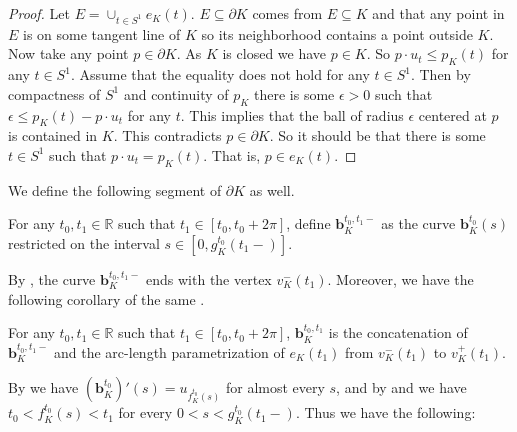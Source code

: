 \begin{proof}
Let \(E = \cup_{t \in S^1} e_K(t)\). \(E \subseteq \partial K\) comes from \(E \subseteq K\) and that any point in \(E\) is on some tangent line of \(K\) so its neighborhood contains a point outside \(K\). Now take any point \(p \in \partial K\). As \(K\) is closed we have \(p \in K\). So \(p \cdot u_t \leq p_K(t)\) for any \(t \in S^1\). Assume that the equality does not hold for any \(t \in S^1\). Then by compactness of \(S^1\) and continuity of \(p_K\) there is some \(\epsilon > 0\) such that \(\epsilon \leq p_K(t) - p\cdot u_t\) for any \(t\). This implies that the ball of radius \(\epsilon\) centered at \(p\) is contained in \(K\). This contradicts \(p \in \partial K\). So it should be that there is some \(t \in S^1\) such that \(p \cdot u_t = p_K(t)\). That is, \(p \in e_K(t)\).
\end{proof}

We define the following segment of \(\partial K\) as well.

\begin{definition}

For any \(t_0, t_1 \in \mathbb{R}\) such that \(t_1 \in [t_0, t_0 + 2 \pi]\), define \(\mathbf{b}_{K}^{t_0, t_1-}\) as the curve \(\mathbf{b}_{K}^{t_0} (s)\) restricted on the interval \(s \in [0, g_{K}^{t_0}(t_1-)]\).

\label{def:param-segment-open}
\end{definition}

By , the curve \(\mathbf{b}_K^{t_0, t_1-}\) ends with the vertex \(v_K^-(t_1)\). Moreover, we have the following corollary of the same .

\begin{corollary}

For any \(t_0, t_1 \in \mathbb{R}\) such that \(t_1 \in [t_0, t_0 + 2 \pi]\), \(\mathbf{b}_K^{t_0, t_1}\) is the concatenation of \(\mathbf{b}_K^{t_0, t_1 - }\) and the arc-length parametrization of \(e_K(t_1)\) from \(v_K^-(t_1)\) to \(v_K^+(t_1)\).

\label{cor:param-segment-open}
\end{corollary}

By  we have \(\left(\mathbf{b}_{K}^{t_0}\right)'(s) = u_{f_K^{t_0}(s)}\) for almost every \(s\), and by  and  we have \(t_0 < f_K^{t_0}(s) < t_1\) for every \(0 < s < g_{K}^{t_0}(t_1-)\). Thus we have the following:

